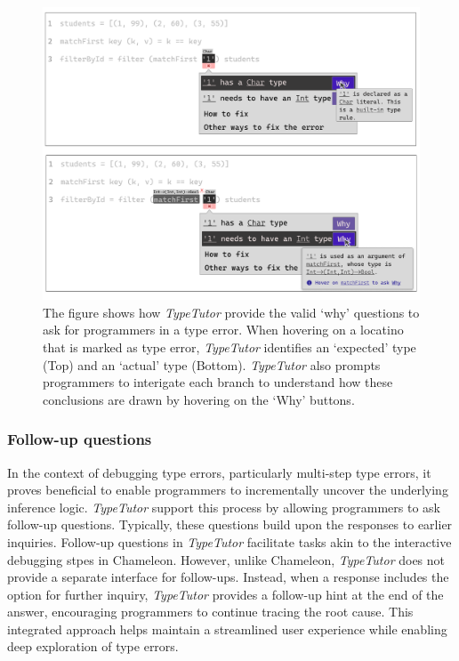 \begin{figure}[hbt]
  \includegraphics[width=\linewidth]{Why}
  \caption{
      \label{fig:why}
      The figure shows how \textit{TypeTutor} provide the valid `why' questions to ask for programmers in a type error. When hovering on a locatino that is marked as type error, \textit{TypeTutor} identifies an `expected' type (Top) and an `actual' type (Bottom). \textit{TypeTutor} also prompts programmers to interigate each branch to understand how these conclusions are drawn by hovering on the `Why' buttons. 
    }
\end{figure}



\subsubsection{Follow-up questions}

In the context of debugging type errors, particularly multi-step type errors, it proves beneficial to enable programmers to incrementally uncover the underlying inference logic. \textit{TypeTutor} support this process by allowing programmers to ask follow-up questions. Typically, these questions build upon the responses to earlier inquiries. Follow-up questions in \textit{TypeTutor} facilitate tasks akin to the interactive debugging stpes in Chameleon. However, unlike Chameleon, \textit{TypeTutor} does not provide a separate interface for follow-ups. Instead, when a response includes the option for further inquiry, \textit{TypeTutor} provides a follow-up hint at the end of the answer, encouraging programmers to continue tracing the root cause. This integrated approach helps maintain a streamlined user experience while enabling deep exploration of type errors.


